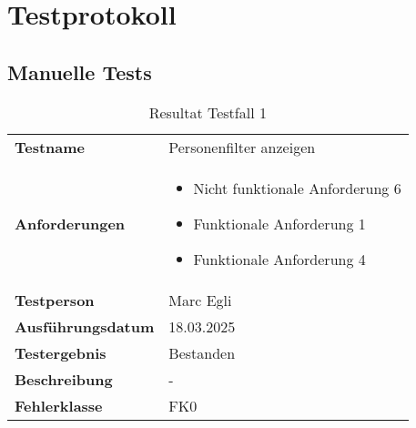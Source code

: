 \section{Testprotokoll}

\subsection{Manuelle Tests}

\begin{table}[H]
    \begin{tabular}{|L{0.3\textwidth}|L{0.65\textwidth}|}
        \hline
           \\[10pt]
        \hline
        \textbf{Testname} & Personenfilter anzeigen \\
        \hline
        \textbf{Anforderungen} & 
        \begin{itemize}
            \item Nicht funktionale Anforderung 6
            \item Funktionale Anforderung 1
            \item Funktionale Anforderung 4
        \end{itemize} \\
        \hline
        \textbf{Testperson} & Marc Egli \\
        \hline
        \textbf{Ausführungsdatum} & 18.03.2025 \\
        \hline
        \textbf{Testergebnis} & Bestanden \\
        \hline
        \textbf{Beschreibung} & - \\ 
        \hline
        \textbf{Fehlerklasse} & FK0 \\ 
        \hline
    \end{tabular}
    \caption{Resultat Testfall 1}
\end{table}

